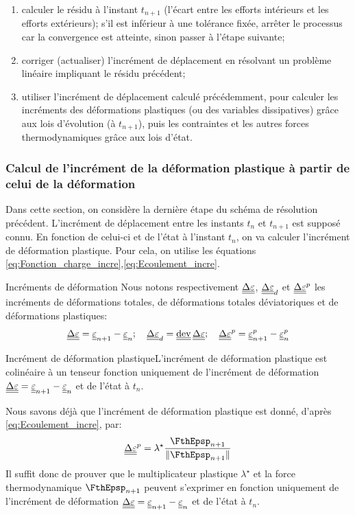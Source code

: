 \documentclass[10pt]{book}
\begin{document}
\begin{appendices}
\begin{enumerate}
\item calculer le résidu à l'instant $t_{n+1}$ (l'écart entre les efforts intérieurs et les efforts extérieurs); s'il est inférieur à une tolérance fixée, arrêter le processus car la convergence est atteinte, sinon passer à l'étape suivante;
\item corriger (actualiser) l'incrément de déplacement en résolvant un problème linéaire impliquant le résidu précédent;
\item utiliser l'incrément de déplacement calculé précédemment, pour calculer les incréments des déformations plastiques (ou des variables dissipatives) grâce aux lois d'évolution (à $t_{n+1}$), puis les contraintes et les autres forces thermodynamiques grâce aux lois d'état.
\end{enumerate}
\subsubsection{Calcul de l'incrément de la déformation plastique à partir de celui de la déformation}
Dans cette section, on considère la dernière étape du schéma de résolution précédent. L'incrément de déplacement entre les instants $t_{n}$ et $t_{n+1}$ est supposé connu. En fonction de celui-ci et de l'état à l'instant $t_{n}$, on va calculer l'incrément de déformation plastique. Pour cela, on utilise les équations \eqref{eq:Fonction_charge_incre},\eqref{eq:Ecoulement_incre}.\\
\begin{Not}{Incréments de déformation} Nous notons respectivement $\underline{\underline{\Delta}}\underline{\underline{\varepsilon}}$, $\underline{\underline{\Delta}}\underline{\underline{\varepsilon}}_{d}$ et $\underline{\underline{\Delta}}\underline{\underline{\varepsilon}}^{p}$ les incréments de déformations totales, de déformations totales déviatoriques et de déformations plastiques:
$$\DeltaDefoHPP = \DefoHPP_{n+1}-\DefoHPP_{n}; \quad \DeltaDefoHPP_{d}=\dev\DeltaDefoHPP; \quad \DeltaEpsP=\EpsP_{n+1}-\EpsP_{n}$$
\end{Not}
\begin{Theo}{Incrément de déformation plastique}L'incrément de déformation plastique est colinéaire à un tenseur fonction uniquement de l'incrément de déformation $\underline{\underline{\Delta}}\underline{\underline{\varepsilon}}=\underline{\underline{\varepsilon}}_{n+1}-\underline{\underline{\varepsilon}}_{n}$ et de l'état à $t_{n}.$ 
\end{Theo}
\begin{Demo}{Nous savons déjà que l'incrément de déformation plastique est donné, d'après \eqref{eq:Ecoulement_incre}, par:
$$\DeltaEpsP=\lambda^{\star}\frac{\FthEpsp_{n+1}}{\Vert \FthEpsp_{n+1}\Vert}$$
Il suffit donc de prouver que le multiplicateur plastique $\lambda^{\star}$ et la force thermodynamique $\FthEpsp_{n+1}$ peuvent s’exprimer en fonction uniquement de l'incrément de déformation $\underline{\underline{\Delta}}\underline{\underline{\varepsilon}}=\underline{\underline{\varepsilon}}_{n+1}-\underline{\underline{\varepsilon}}_{n}$ et de l'état à $t_{n}$.\\

}
\end{Demo}
\end{appendices}
\end{document}
